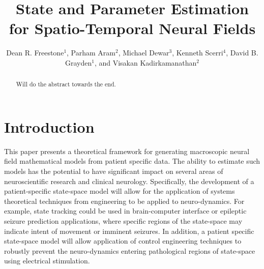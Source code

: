 \documentclass[12pt]{iopart}
\begin{document}

\title[State and Parameter Estimation for Spatio-Temporal Neural Fields]{State and Parameter Estimation for Spatio-Temporal Neural Fields}

\author{Dean R. Freestone$^1$, Parham Aram$^2$, Michael Dewar$^3$, Kenneth Scerri$^4$, David B. Grayden$^1$, and Visakan Kadirkamanathan$^2$}

\address{$^1$ Department of Electrical and Electronic Engineering, University of Melbourne, Melbourne, Vic, 3010 Australia} \address{$^2$ Department of Automatic Control and Systems Engineering, University of Sheffield, Mappin Street, Sheffield, S1 3JD, UK} \address{$^3$ Department of Applied Physics and Applied Mathematics, Columbia University, US} \address{$^4$ Ken's}  
\begin{abstract}
	Will do the abstract towards the end. 
\end{abstract}

\maketitle

\section{Introduction} This paper presents a theoretical framework for generating macroscopic neural field  mathematical models from patient specific data. The ability to estimate such models has the potential to have significant impact on several areas of neuroscientific research and clinical neurology. Specifically, the development of a patient-specific state-space model will allow for the application of systems theoretical techniques from engineering to be applied to neuro-dynamics. For example, state tracking could be used in brain-computer interface or epileptic seizure prediction applications, where specific regions of the state-space may indicate intent of movement or imminent seizures. In addition, a patient specific state-space model will allow application of control engineering techniques to robustly prevent the neuro-dynamics entering pathological regions of state-space using electrical stimulation. 
\end{document}
